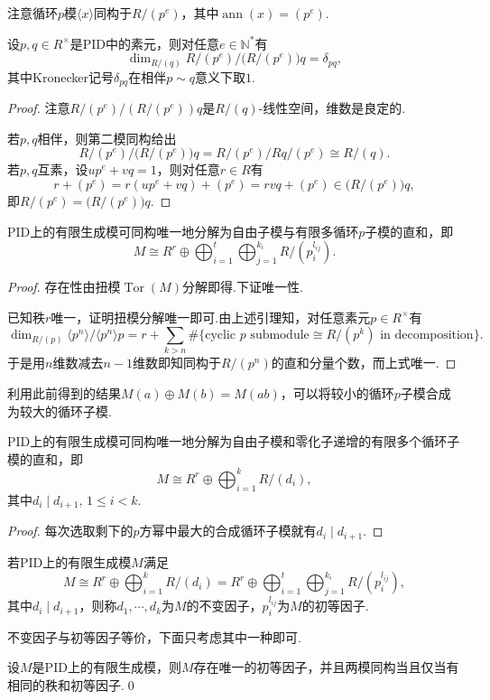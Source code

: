 注意循环$p$模$\langle x\rangle$同构于$R/(p^e)$，其中$\operatorname*{ann}(x)=(p^e)$.
\begin{lemma*}
    设$p,q\in R^\times$是PID中的素元，则对任意$e\in\mathbb{N}^*$有
    \[
        \dim_{R/(q)}R/(p^e)\Big/\bigl(R/(p^e)\bigr)q=\delta_{pq},
    \]
    其中Kronecker记号$\delta_{pq}$在相伴$p\sim q$意义下取$1$.
\end{lemma*}
\begin{proof}
    注意$R/(p^e)\big/(R/(p^e))q$是$R/(q)$-线性空间，维数是良定的.

    若$p,q$相伴，则第二模同构给出
    \[
        R/(p^e)\Big/\bigl(R/(p^e)\bigr)q=R/(p^e)\big/Rq/(p^e)\cong R/(q).
    \]
    若$p,q$互素，设$up^e+vq=1$，则对任意$r\in R$有
    \[
        r+(p^e)=r(up^e+vq)+(p^e)=rvq+(p^e)\in\bigl(R/(p^e)\bigr)q,
    \]
    即$R/(p^e)=\bigl(R/(p^e)\bigr)q$.
\end{proof}
\begin{thm}[(第一标准分解)]
    PID上的有限生成模可同构唯一地分解为自由子模与有限多循环$p$子模的直和，即
    \[
        M\cong R^r\oplus\bigoplus_{i=1}^t\bigoplus_{j=1}^{k_i}R/(p_i^{l_{ij}}).
    \]
\end{thm}
\begin{proof}
    存在性由扭模$\operatorname*{Tor}(M)$分解即得.下证唯一性.

    已知秩$r$唯一，证明扭模分解唯一即可.由上述引理知，对任意素元$p\in R^\times$有
    \[
        \dim_{R/(p)}\langle p^n\rangle/\langle p^n\rangle p=r+\sum_{k>n}\#\{\text{cyclic }p \text{ submodule}\cong R/(p^k)\text{ in decomposition}\}.
    \]
    于是用$n$维数减去$n-1$维数即知同构于$R/(p^n)$的直和分量个数，而上式唯一.
\end{proof}

利用此前得到的结果$M(a)\oplus M(b)=M(ab)$，可以将较小的循环$p$子模合成为较大的循环子模.
\begin{thm}[(第二标准分解)]
    PID上的有限生成模可同构唯一地分解为自由子模和零化子递增的有限多个循环子模的直和，即
    \[
        M\cong R^r\oplus\bigoplus_{i=1}^k R/(d_i),
    \]
    其中$d_i\mid d_{i+1},\,1\le i<k$.
\end{thm}
\begin{proof}
    每次选取剩下的$p$方幂中最大的合成循环子模就有$d_i\mid d_{i+1}$.
\end{proof}

\begin{definition}
    若PID上的有限生成模$M$满足
    \[
        M\cong R^r\oplus\bigoplus_{i=1}^k R/(d_i)=R^r\oplus\bigoplus_{i=1}^t\bigoplus_{j=1}^{k_i}R/(p_i^{l_{ij}}),
    \]
    其中$d_i\mid d_{i+1}$，则称$d_1,\cdots,d_k$为$M$的{\heiti 不变因子}，$p_i^{l_{ij}}$为$M$的{\heiti 初等因子}.
\end{definition}
\begin{remark}
    不变因子与初等因子等价，下面只考虑其中一种即可.
\end{remark}
\begin{thm}[(PID上有限生成模结构)]
    设$M$是PID上的有限生成模，则$M$存在唯一的初等因子，并且两模同构当且仅当有相同的秩和初等因子.\qed
\end{thm}

